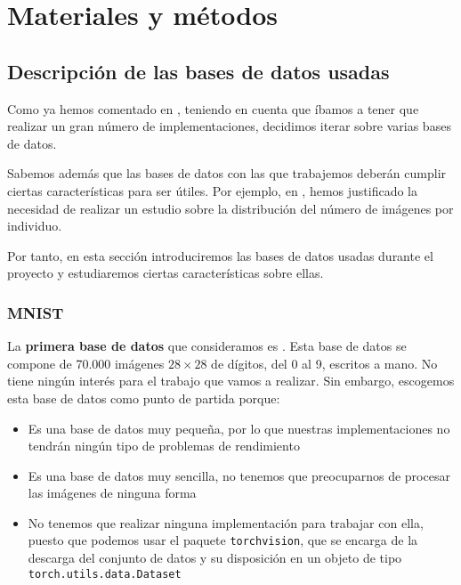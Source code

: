 \chapter{Materiales y métodos}

\section{Descripción de las bases de datos usadas} \label{isec:base_datos_usada}

Como ya hemos comentado en , teniendo en cuenta que íbamos a tener que realizar un gran número de implementaciones, decidimos iterar sobre varias bases de datos.

Sabemos además que las bases de datos con las que trabajemos deberán cumplir ciertas características para ser útiles. Por ejemplo, en , hemos justificado la necesidad de realizar un estudio sobre la distribución del número de imágenes por individuo.

Por tanto, en esta sección introduciremos las bases de datos usadas durante el proyecto y estudiaremos ciertas características sobre ellas.

\subsection{MNIST}

La \textbf{primera base de datos} que consideramos es  \cite{informatica:mnist}. Esta base de datos se compone de 70.000 imágenes $28 \times 28$ de dígitos, del 0 al 9, escritos a mano. No tiene ningún interés para el trabajo que vamos a realizar. Sin embargo, escogemos esta base de datos como punto de partida porque:

\begin{itemize}
    \item Es una base de datos muy pequeña, por lo que nuestras implementaciones no tendrán ningún tipo de problemas de rendimiento
    \item Es una base de datos muy sencilla, no tenemos que preocuparnos de procesar las imágenes de ninguna forma
    \item No tenemos que realizar ninguna implementación para trabajar con ella, puesto que podemos usar el paquete \lstinline{torchvision}, que se encarga de la descarga del conjunto de datos y su disposición en un objeto de tipo \lstinline{torch.utils.data.Dataset}
\end{itemize}

